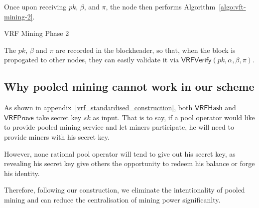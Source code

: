 Once upon receiving $pk$, $\beta$, and $\pi$, the node then performs Algorithm~\ref{algo:vft-mining-2}.

\begin{algorithm}[H]
\caption{VRF Mining Phase 2}
\label{algo:vft-mining-2}
\SetAlgoLined
{}
\end{algorithm}

The $pk$, $\beta$ and $\pi$ are recorded in the blockheader, so that, when the block is propogated to other nodes, they can easily validate it via $\mathsf{VRFVerify}(pk, \alpha, \beta, \pi)$.



\subsection{Why pooled mining cannot work in our scheme}
\label{sec:discourage-pool}

As shown in appendix~\ref{vrf_standardised_construction}, both $\mathsf{VRFHash}$ and $\mathsf{VRFProve}$ take secret key $sk$ as input.
That is to say, if a pool operator would like to provide pooled mining service and let miners participate, he will need to provide miners with his secret key.

However, none rational pool operator will tend to give out his secret key, as revealing his secret key give others the opportunity to redeem his balance or forge his identity.

Therefore, following our construction, we eliminate the intentionality of pooled mining and can reduce the centralisation of mining power significanlty.
